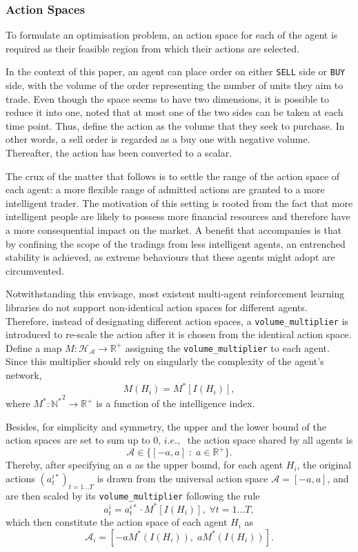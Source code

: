 \documentclass[11pt,twoside]{article}
\numberwithin{Theorem}{section}
\numberwithin{Definition}{section}
\numberwithin{Lemma}{section}
\numberwithin{Algorithm}{section}
\numberwithin{equation}{section}
\begin{document}
\subsubsection{Action Spaces}
To formulate an optimisation problem, an action space for each of the agent is required as their feasible region from which their actions are selected.

In the context of this paper, an agent can place order on either \verb|SELL| side or \verb|BUY| side, with the volume of the order representing the number of units they aim to trade. Even though the space seems to have two dimensions, it is possible to reduce it into one, noted that at most one of the two sides can be taken at each time point. Thus, define the action as the volume that they seek to purchase. In other words, a sell order is regarded as a buy one with negative volume. Thereafter, the action has been converted to a scalar.

The crux of the matter that follows is to settle the range of the action space of each agent: a more flexible range of admitted actions are granted to a more intelligent trader. The motivation of this setting is rooted from the fact that more intelligent people are likely to possess more financial resources and therefore have a more consequential impact on the market. A benefit that accompanies is that by confining the scope of the tradings from less intelligent agents, an entrenched stability is achieved, as extreme behaviours that these agents might adopt are circumvented.

Notwithstanding this envisage, most existent multi-agent reinforcement learning libraries do not support non-identical action spaces for different agents. Therefore, instead of designating different action spaces, a \verb|volume_multiplier| is introduced to re-scale the action after it is chosen from the identical action space. Define a map $M:\mathcal{H_A}\rightarrow\mathbb{R}^+$ assigning the \verb|volume_multiplier| to each agent. Since this multiplier should rely on singularly the complexity of the agent's network, 
$$M(H_i)=M^*\left[I(H_i)\right],$$
where $M^*:\mathbb{N^*}^2\rightarrow\mathbb{R}^+$ is a function of the intelligence index.

Besides, for simplicity and symmetry, the upper and the lower bound of the action spaces are set to sum up to 0, $i.e.,\;$ the action space shared by all agents is $$\mathcal{A}\in\{\left[-a,a\right]\;:\;a\in\mathbb{R}^+\}.$$
Thereby, after specifying an $a$ as the upper bound, for each agent $H_i$, the original actions $(a^{i*}_t)_{t=1\dots T}$ is drawn from the universal action space $\mathcal{A}=[-a,a]$, and are then scaled by its \verb|volume_multiplier| following the rule
$$
a^i_t=a^{i*}_t\cdot M^*\left[I(H_i)\right],\; \forall t =1\dots T,
$$
which then constitute the action space of each agent $H_i$ as 
$$\mathcal{A}_i=\left[-a M^*(I(H_i)),\;a M^*(I(H_i))\right].$$
\end{document}
